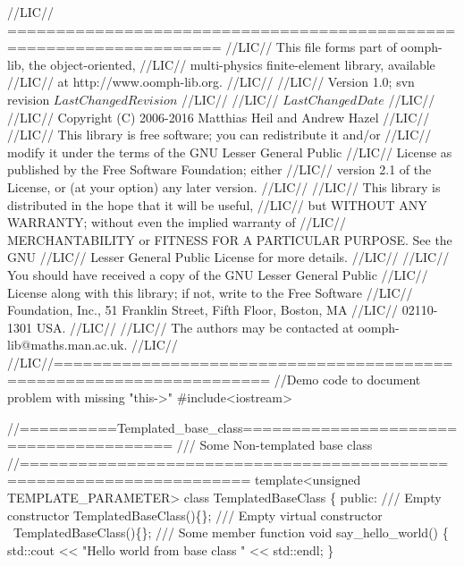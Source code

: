 \begin{DoxyCodeInclude}
\textcolor{comment}{//LIC// ====================================================================}
\textcolor{comment}{//LIC// This file forms part of oomph-lib, the object-oriented, }
\textcolor{comment}{//LIC// multi-physics finite-element library, available }
\textcolor{comment}{//LIC// at http://www.oomph-lib.org.}
\textcolor{comment}{//LIC// }
\textcolor{comment}{//LIC//    Version 1.0; svn revision $LastChangedRevision$}
\textcolor{comment}{//LIC//}
\textcolor{comment}{//LIC// $LastChangedDate$}
\textcolor{comment}{//LIC// }
\textcolor{comment}{//LIC// Copyright (C) 2006-2016 Matthias Heil and Andrew Hazel}
\textcolor{comment}{//LIC// }
\textcolor{comment}{//LIC// This library is free software; you can redistribute it and/or}
\textcolor{comment}{//LIC// modify it under the terms of the GNU Lesser General Public}
\textcolor{comment}{//LIC// License as published by the Free Software Foundation; either}
\textcolor{comment}{//LIC// version 2.1 of the License, or (at your option) any later version.}
\textcolor{comment}{//LIC// }
\textcolor{comment}{//LIC// This library is distributed in the hope that it will be useful,}
\textcolor{comment}{//LIC// but WITHOUT ANY WARRANTY; without even the implied warranty of}
\textcolor{comment}{//LIC// MERCHANTABILITY or FITNESS FOR A PARTICULAR PURPOSE.  See the GNU}
\textcolor{comment}{//LIC// Lesser General Public License for more details.}
\textcolor{comment}{//LIC// }
\textcolor{comment}{//LIC// You should have received a copy of the GNU Lesser General Public}
\textcolor{comment}{//LIC// License along with this library; if not, write to the Free Software}
\textcolor{comment}{//LIC// Foundation, Inc., 51 Franklin Street, Fifth Floor, Boston, MA}
\textcolor{comment}{//LIC// 02110-1301  USA.}
\textcolor{comment}{//LIC// }
\textcolor{comment}{//LIC// The authors may be contacted at oomph-lib@maths.man.ac.uk.}
\textcolor{comment}{//LIC// }
\textcolor{comment}{//LIC//====================================================================}
\textcolor{comment}{//Demo code to document problem with missing "this->"}
\textcolor{preprocessor}{#include<iostream>}



\textcolor{comment}{//==========Templated\_base\_class=======================================}\textcolor{comment}{}
\textcolor{comment}{/// Some Non-templated base class}
\textcolor{comment}{}\textcolor{comment}{//=====================================================================}
\textcolor{keyword}{template}<\textcolor{keywordtype}{unsigned} TEMPLATE\_PARAMETER>
\textcolor{keyword}{class }TemplatedBaseClass
\{
\textcolor{keyword}{public}:
\textcolor{comment}{}
\textcolor{comment}{ /// Empty constructor}
\textcolor{comment}{} TemplatedBaseClass()\{\};
\textcolor{comment}{}
\textcolor{comment}{ /// Empty virtual constructor}
\textcolor{comment}{} ~TemplatedBaseClass()\{\};
\textcolor{comment}{}
\textcolor{comment}{ /// Some member function}
\textcolor{comment}{} \textcolor{keywordtype}{void} say\_hello\_world()
  \{
   std::cout << \textcolor{stringliteral}{"Hello world from base class "} << std::endl;
  \}


\end{DoxyCodeInclude}
